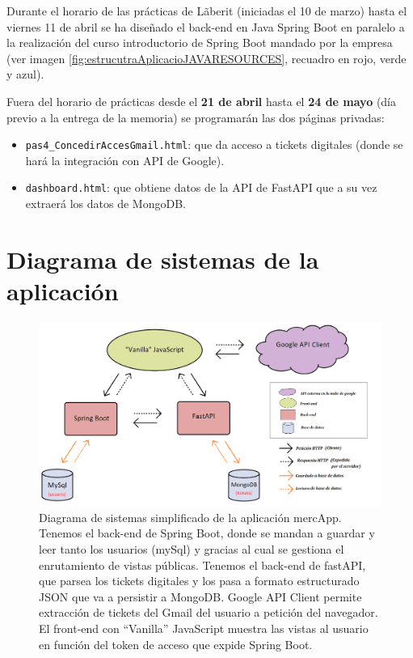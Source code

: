\documentclass[a4paper,12pt]{report}
\begin{document}
		Durante el horario de las prácticas de Lãberit (iniciadas el 10 de marzo) hasta el viernes 11 de abril se ha diseñado el back-end en Java Spring Boot en paralelo a la realización del curso introductorio de Spring Boot mandado por la empresa (ver imagen \ref{fig:estrucutraAplicacioJAVARESOURCES}, recuadro en rojo, verde y azul).
		
		Fuera del horario de prácticas desde el \textbf{21 de abril} hasta el \textbf{24 de mayo} (día previo a la entrega de la memoria) se programarán las dos páginas privadas:
		
		\begin{itemize}
			\item \texttt{pas4\_ConcedirAccesGmail.html}: que da acceso a tickets digitales (donde se hará la integración con API de Google).
			\item \texttt{dashboard.html}: que obtiene datos de la API de FastAPI que a su vez extraerá los datos de MongoDB.
		\end{itemize}

		
		
		
		

		

		
		\section{Diagrama de sistemas de la aplicación}
		
				
		\setlength{\belowcaptionskip}{3pt}
		\FloatBarrier
		\begin{figure}[H]
			\centering
			\includegraphics[width=1\textwidth]{img/diagramaSistemesAplicacioMercapp.png}
			\caption{Diagrama de sistemas simplificado de la aplicación mercApp. Tenemos el back-end de Spring Boot, donde se mandan a guardar y leer tanto los usuarios (mySql) y gracias al cual se gestiona el enrutamiento de vistas públicas. Tenemos el back-end de fastAPI, que parsea los tickets digitales y los pasa a formato estructurado JSON que va a persistir a MongoDB. Google API Client permite extracción de tickets del Gmail del usuario a petición del navegador. El front-end con ``Vanilla'' JavaScript muestra las vistas al usuario en función del token de acceso que expide Spring Boot.}

			
			\label{fig:diagramaSistemesAplicacioMercapp} 
		\end{figure}
		\FloatBarrier
				
\end{document}
